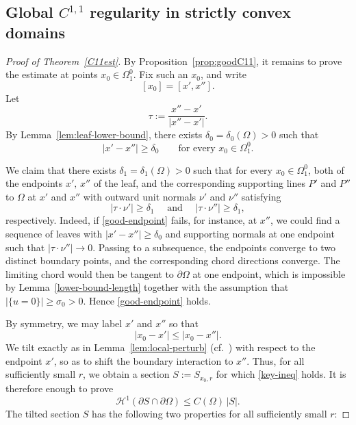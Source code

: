 \documentclass[reqno,11pt]{amsart}
\numberwithin{equation}{section}
\theoremstyle{remark}
\begin{document}
\subsection{Global $C^{1,1}$ regularity in strictly convex domains}

\begin{proof}[Proof of Theorem~\ref{C11est}]
By Proposition~\ref{prop:goodC11}, it remains to prove the estimate at points
$x_0\in \Omega_1^0$.
Fix such an $x_0$, and write
\[
[x_0]=[x',x''].
\]
Let
\[
\tau:=\frac{x''-x'}{|x''-x'|}.
\]
By Lemma~\ref{lem:leaf-lower-bound}, there exists $\delta_0=\delta_0(\Omega)>0$
such that
\begin{equation}\label{leaf-lower-bound-C11}
|x'-x''|\ge \delta_0
\qquad\text{for every }x_0\in\Omega_1^0.
\end{equation}

We claim that there exists
$\delta_1=\delta_1(\Omega)>0$ such that for every $x_0\in\Omega_1^0$, both of the endpoints $x',\,x''$ of the leaf,  and the corresponding supporting lines $P'$ and $P''$ to
$\Omega$ at $x'$ and $x''$ with outward unit normals $\nu'$ and $\nu''$ satisfying
\begin{equation}\label{good-endpoint}
|\tau\cdot \nu'|\ge \delta_1 \quad \text{ and }
\quad |\tau\cdot \nu''|\ge \delta_1,
\end{equation}
respectively. 
Indeed, if \eqref{good-endpoint} fails, for instance, at $x''$,  we could find a sequence of leaves with
$|x'-x''|\ge\delta_0$ and supporting normals at one endpoint such that
$|\tau\cdot\nu''|\to0$. 
Passing to a subsequence, the endpoints converge to two distinct boundary points, and the corresponding chord directions converge. The limiting chord would then be tangent to $\partial\Omega$ at one endpoint, which is impossible by Lemma~\ref{lower-bound-length} together with the assumption that $|\{u=0\}|\ge \sigma_0>0$. Hence \eqref{good-endpoint} holds.


By symmetry, we may label $x'$ and $x''$ so that
\begin{equation}\label{retained-point}
 |x_0-x'|\le |x_0-x''|.   
\end{equation} 
We tilt exactly as in Lemma~\ref{lem:local-perturb} (cf.\ \cite[(33)]{MRZ20252})
with respect to the endpoint $x'$, so as to shift the boundary  interaction to $x''$.
Thus, for all sufficiently small $r$, we obtain a section
$S:=S_{x_0,r}$
for which \eqref{key-ineq} holds. It is therefore enough to prove
\begin{equation}\label{boundarysize}
\mathscr H^1(\partial S\cap\partial\Omega)\le C(\Omega)\,|S|.
\end{equation}
The tilted section $S$ has the
following two properties for all sufficiently small $r$:


\end{proof}
\end{document}
